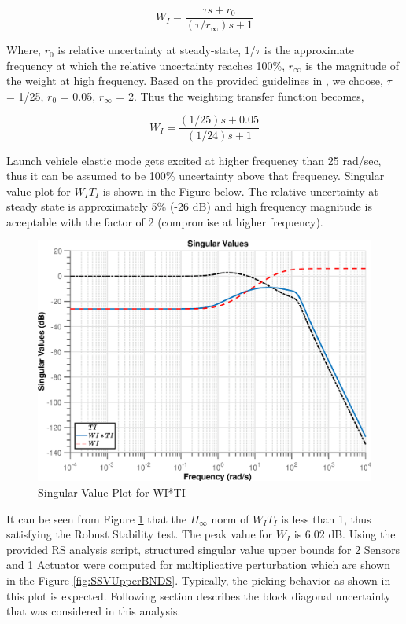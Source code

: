 \documentclass[12pt]{article}
\begin{document}
	\begin{equation}
	W_I = \frac{\tau s + r_{0}}{(\tau/r_{\infty})s + 1}
	\end{equation} 
	
	\noindent Where, $r_{0}$ is relative uncertainty at steady-state, $1/\tau$ is the approximate frequency at which the relative uncertainty reaches 100\%, $r_{\infty}$ is the magnitude of the weight at high frequency. Based on the provided guidelines in \cite{cite3}, we choose, $\tau$ = 1/25, $r_{0}$ = 0.05, $r_{\infty}$ = 2. Thus the weighting transfer function becomes,  
	
	\begin{equation}
	W_I = \frac{(1/25) s + 0.05}{(1/24)s + 1}
	\end{equation} 
	
	\noindent Launch vehicle elastic mode gets excited at higher frequency than 25 rad/sec, thus it can be assumed to be 100\% uncertainty above that frequency. Singular value plot for $W_I T_I$ is shown in the Figure below. The relative uncertainty at steady state is approximately 5\% (-26 dB) and high frequency magnitude is acceptable with the factor of 2 (compromise at higher frequency).
	
	\begin{figure}[H]
		\centering
		\includegraphics[width=0.8\linewidth]{SigmaOfWiTi}
		\caption{Singular Value Plot for WI*TI}
		\label{fig:sigmaofwiti}
	\end{figure}
	
	\noindent It can be seen from Figure \ref{fig:sigmaofwiti} that the $H_{\infty}$ norm of $W_I T_I$ is less than 1, thus satisfying the Robust Stability test. The peak value for $W_{I}$ is 6.02 dB. Using the provided RS analysis script, structured singular value upper bounds for 2 Sensors and 1 Actuator were computed for multiplicative perturbation which are shown in the Figure \ref{fig:SSVUpperBNDS}. Typically, the picking behavior as shown in this plot is expected. Following section describes the block diagonal uncertainty that was considered in this analysis.
	
\end{document}
